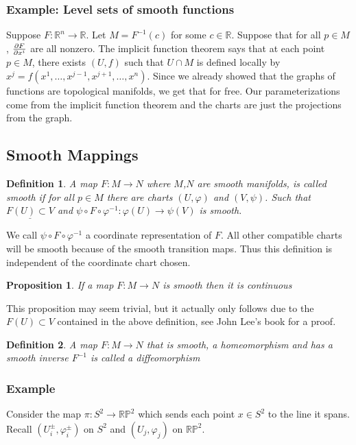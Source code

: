 \documentclass[a4paper]{article}
\newtheorem*{prop}{Proposition}
\newtheorem*{defn}{Definition}
\begin{document}
\subsubsection*{Example: Level sets of smooth functions}%
\label{ssub:Example: Level sets of smooth functions}
Suppose $F: \mathds{R}^n \rightarrow \mathds{R}$. Let $M = F^{-1}(c)$ for some $c \in \mathds{R}$. Suppose that for all $p \in M$, $\pdv{F}{x^i}$ are all nonzero. The implicit function theorem says that at each point $p \in M$, there exists $(U,f)$ such that $U \cap M$ is defined locally by $x^j = f(x^1, \dots, x^{j-1}, x^{j+1}, \dots, x^n)$. Since we already showed that the graphs of functions are topological manifolds, we get that for free. Our parameterizations come from the implicit function theorem and the charts are just the projections from the graph.

\subsection*{Smooth Mappings}%
\label{sub:Smooth Mappings}

\begin{defn}
  A map $F: M \rightarrow N$ where $M$,$N$ are smooth manifolds, is called smooth if for all $p \in M$ there are charts $(U, \varphi)$ and $(V, \psi)$.  Such that $\underline{F(U) \subset V}$ and $\psi \circ F \circ \varphi^{-1}: \varphi(U) \rightarrow \psi(V)$ is smooth.
\end{defn}
We call $\psi \circ F \circ \varphi^{-1}$ a coordinate representation of $F$. All other compatible charts will be smooth because of the smooth transition maps. Thus this definition is independent of the coordinate chart chosen.
\begin{prop}
 If a map $F: M \rightarrow N$ is smooth then it is continuous 
\end{prop}
This proposition may seem trivial, but it actually only follows due to the $F(U) \subset V$ contained in the above definition, see John Lee's book for a proof.

\begin{defn}
  A map $F: M \rightarrow N$ that is smooth, a homeomorphism and has a smooth inverse $F^{-1}$ is called a diffeomorphism
\end{defn}

\subsubsection*{Example}%
Consider the map $\pi: S^2 \rightarrow \mathds{RP}^2$ which sends each point $x \in S^2$ to the line it spans. Recall $(U^\pm_i, \varphi^\pm_i)$ on $S^2$ and $(U_j, \varphi_j)$ on $\mathds{RP}^2$.
\end{document}
